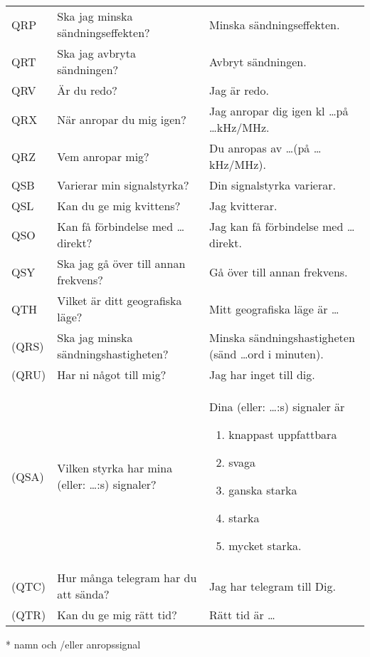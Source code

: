 \begin{table}
\begin{tabular}{lp{6cm}p{6cm}}
    QRP
    &
    Ska jag minska sändningseffekten?
    &
    Minska sändningseffekten.
    \\
    QRT
    &
    Ska jag avbryta sändningen?
    &
    Avbryt sändningen.
    \\
    QRV
    &
    Är du redo?
    &
    Jag är redo.
    \\
    QRX
    &
    När anropar du mig igen?
    &
    Jag anropar dig igen kl \dots på \dots kHz/MHz.
    \\
    QRZ
    &
    Vem anropar mig?
    &
    Du anropas av \dots * (på \dots kHz/MHz).
    \\
    QSB
    &
    Varierar min signalstyrka?
    &
    Din signalstyrka varierar.
    \\
    QSL
    &
    Kan du ge mig kvittens?
    &
    Jag kvitterar.
    \\
    QSO
    &
    Kan få förbindelse med \dots * direkt?
    &
    Jag kan få förbindelse med \dots * direkt.
    \\
    QSY
    &
    Ska jag gå över till annan frekvens?
    &
    Gå över till annan frekvens.
    \\
    QTH
    &
    Vilket är ditt geografiska läge?
    &
    Mitt geografiska läge är \dots
    \\
    (QRS)
    &
    Ska jag minska sändningshastigheten?
    &
    Minska sändningshastigheten
    (sänd \dots ord i minuten).
    \\
    (QRU)
    &
    Har ni något till mig?
    &
    Jag har inget till dig.
    \\
    (QSA)
    &
    Vilken styrka har mina
    (eller: \dots *:s) signaler?
    &
    Dina (eller: \dots *:s) signaler är
    \vspace{-\topsep}
    \begin{enumerate}[noitemsep]
    	\item knappast uppfattbara
    	\item svaga
    	\item ganska starka
    	\item starka
    	\item mycket starka.
    \end{enumerate}
    \\
    (QTC)
    &
    Hur många telegram har du att sända?
    &
    Jag har telegram till Dig.
    \\
    (QTR)
    &
    Kan du ge mig rätt tid?
    &
    Rätt tid är \dots
    \\
  \end{tabular}
* namn och /eller anropssignal
\end{table}

